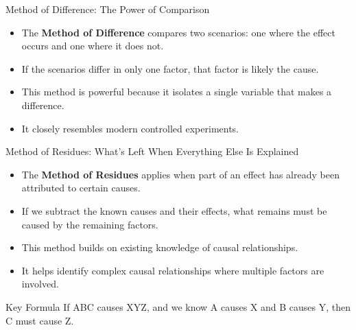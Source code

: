 \documentclass{beamer}
\begin{document}
\begin{frame}{Method of Difference: The Power of Comparison}
    \begin{itemize}
        \item The \textbf{Method of Difference} compares two scenarios: one where the effect occurs and one where it does not.
        \item If the scenarios differ in only one factor, that factor is likely the cause.
        \item This method is powerful because it isolates a single variable that makes a difference.
        \item It closely resembles modern controlled experiments.
    \end{itemize}
    
    \begin{center}
    \end{center}
\end{frame}

\begin{frame}{Method of Residues: What's Left When Everything Else Is Explained}
    \begin{itemize}
        \item The \textbf{Method of Residues} applies when part of an effect has already been attributed to certain causes.
        \item If we subtract the known causes and their effects, what remains must be caused by the remaining factors.
        \item This method builds on existing knowledge of causal relationships.
        \item It helps identify complex causal relationships where multiple factors are involved.
    \end{itemize}
    
    \begin{alertblock}{Key Formula}
        If ABC causes XYZ, and we know A causes X and B causes Y, then C must cause Z.
    \end{alertblock}
\end{frame}
\end{document}
